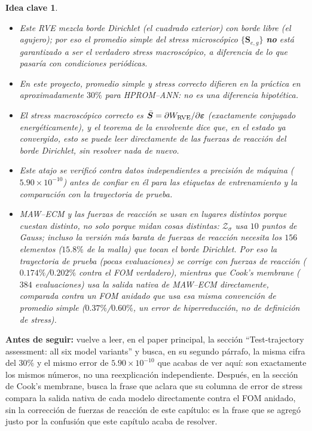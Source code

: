 \documentclass[11pt,a4paper]{article}
\newtheorem{takeaway}{Idea clave}
\begin{document}
\begin{takeaway}
\begin{itemize}
\item Este RVE mezcla borde Dirichlet (el cuadrado exterior) con borde
libre (el agujero); por eso el promedio simple del stress
microsc\'opico $\{\bm S_{e,g}\}$ \textbf{no} est\'a garantizado a ser el
verdadero stress macrosc\'opico, a diferencia de lo que pasar\'ia con
condiciones peri\'odicas.
\item En este proyecto, promedio simple y stress correcto difieren en
la pr\'actica en aproximadamente $30\%$ para HPROM--ANN: no es una
diferencia hipot\'etica.
\item El stress macrosc\'opico correcto es
$\bar{\bm S}=\partial W_{\rm RVE}/\partial\bm\varepsilon$ (exactamente
conjugado energ\'eticamente), y el teorema de la envolvente dice que,
en el estado ya convergido, esto se puede leer directamente de las
fuerzas de reacci\'on del borde Dirichlet, sin resolver nada de nuevo.
\item Este atajo se verific\'o contra datos independientes a
precisi\'on de m\'aquina ($5.90\times10^{-10}$) antes de confiar en \'el
para las etiquetas de entrenamiento y la comparaci\'on con la
trayectoria de prueba.
\item MAW--ECM y las fuerzas de reacci\'on se usan en lugares
distintos porque cuestan distinto, no solo porque midan cosas
distintas: $\mathcal Z_\sigma$ usa $10$ puntos de Gauss; incluso la
versi\'on m\'as barata de fuerzas de reacci\'on necesita los $156$
elementos ($15.8\%$ de la malla) que tocan el borde Dirichlet. Por eso
la trayectoria de prueba (pocas evaluaciones) se corrige con fuerzas
de reacci\'on ($0.174\%$/$0.202\%$ contra el FOM verdadero), mientras
que Cook's membrane ($384$ evaluaciones) usa la salida nativa de
MAW--ECM directamente, comparada contra un FOM anidado que usa esa
misma convenci\'on de promedio simple ($0.37\%$/$0.60\%$, un error de
hiperreducci\'on, no de definici\'on de stress).
\end{itemize}
\end{takeaway}

\bigskip
\noindent\textbf{Antes de seguir:} vuelve a leer, en el paper
principal, la secci\'on ``Test-trajectory assessment: all six model
variants'' y busca, en su segundo p\'arrafo, la misma cifra del
$30\%$ y el mismo error de $5.90\times10^{-10}$ que acabas de ver
aqu\'i: son exactamente los mismos n\'umeros, no una reexplicaci\'on
independiente. Despu\'es, en la secci\'on de Cook's membrane, busca la
frase que aclara que su columna de error de stress compara la salida
nativa de cada modelo directamente contra el FOM anidado, sin la
correcci\'on de fuerzas de reacci\'on de este cap\'itulo: es la frase
que se agreg\'o justo por la confusi\'on que este cap\'itulo acaba de
resolver.
\end{document}

